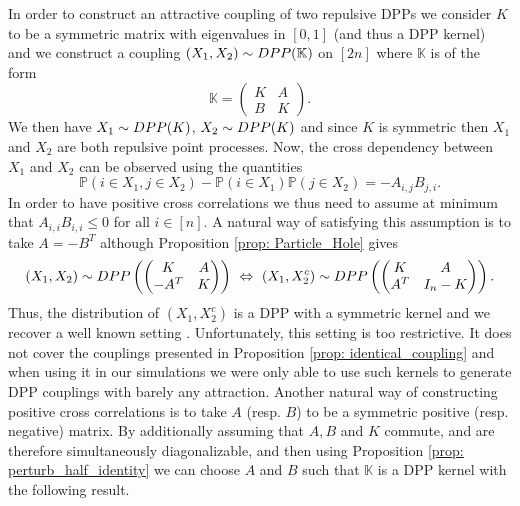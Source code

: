 \documentclass{article}
\numberwithin{equation}{section}
\renewcommand{\leq}{\leqslant}
\newcommand{\bK}{\mathbb{K}}
\newcommand{\DPP}{\textnormal{DPP}}
\theoremstyle{plain}
\begin{document}
In order to construct an attractive coupling of two repulsive DPPs we consider $K$ to be a symmetric matrix with eigenvalues in $[0, 1]$ (and thus a DPP kernel) and we construct a coupling $(X_1, X_2)\sim \DPP(\bK)$ on $[2n]$ where $\mathbb{K}$ is of the form
\begin{equation}\label{eq: Coupling_Matrix}
\mathbb{K}=\begin{pmatrix}
K & A \\ B & K
\end{pmatrix}.
\end{equation}
We then have $X_1\sim \DPP(K)$, $X_2\sim \DPP(K)$ and since $K$ is symmetric then $X_1$ and $X_2$ are both repulsive point processes. Now, the cross dependency between $X_1$ and $X_2$ can be observed using the quantities
\[\mathbb{P}(i\in X_1, j\in X_2) - \mathbb{P}(i\in X_1)\mathbb{P}(j\in X_2) = -A_{i,j}B_{j,i}.\]
In order to have positive cross correlations we thus need to assume at minimum that $A_{i,i}B_{i,i}\leq 0$ for all $i\in [n]$. A natural way of satisfying this assumption is to take $A=-B^T$ although Proposition \ref{prop: Particle_Hole} gives
\[(X_1, X_2)\sim \DPP\left(\begin{pmatrix}
K & A \\ -A^T & K
\end{pmatrix}\right)~\Leftrightarrow~(X_1, X_2^c)\sim \DPP\left(\begin{pmatrix}
K & A \\ A^T & I_n-K
\end{pmatrix}\right).\]
Thus, the distribution of $(X_1, X_2^c)$ is a DPP with a symmetric kernel and we recover a well known setting \cite{Gourieroux}. Unfortunately, this setting is too restrictive. It does not cover the couplings presented in Proposition \ref{prop: identical_coupling} and when using it in our simulations we were only able to use such kernels to generate DPP couplings with barely any attraction. Another natural way of constructing positive cross correlations is to take $A$ (resp. $B$) to be a symmetric positive (resp. negative) matrix. By additionally assuming that $A, B$ and $K$ commute, and are therefore simultaneously diagonalizable, and then using Proposition \ref{prop: perturb_half_identity} we can choose $A$ and $B$ such that $\mathbb{K}$ is a DPP kernel with the following result.
\end{document}
